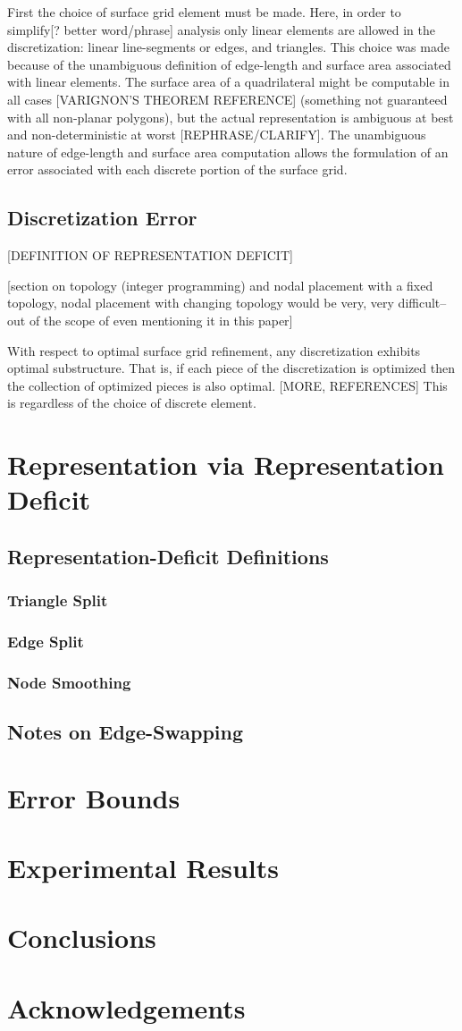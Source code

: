 \documentclass[11pt]{article}
\begin{document}
First the choice of surface grid element must be made. Here, in order to simplify[? better word/phrase] analysis only linear elements are allowed in the discretization: linear line-segments or edges, and triangles. This choice was made because of the unambiguous definition of edge-length and surface area associated with linear elements. The surface area of a quadrilateral might be computable in all cases [VARIGNON'S THEOREM REFERENCE] (something not guaranteed with all non-planar polygons), but the actual representation is ambiguous at best and non-deterministic at worst [REPHRASE/CLARIFY]. The unambiguous nature of edge-length and surface area computation allows the formulation of an error associated with each discrete portion of the surface grid.

\subsection{Discretization Error}
[DEFINITION OF REPRESENTATION DEFICIT]

[section on topology (integer programming) and nodal placement with a fixed topology, nodal placement with changing topology would be very, very difficult--out of the scope of even mentioning it in this paper]

With respect to optimal surface grid refinement, any discretization exhibits optimal substructure. That is, if each piece of the discretization is optimized then the collection of optimized pieces is also optimal. [MORE, REFERENCES] This is regardless of the choice of discrete element.


\section{Representation via Representation Deficit}
\subsection{Representation-Deficit Definitions}
\subsubsection{Triangle Split}
\subsubsection{Edge Split}
\subsubsection{Node Smoothing}
\subsection{Notes on Edge-Swapping}
\section{Error Bounds}
\section{Experimental Results}
\section{Conclusions}
\section{Acknowledgements}
\end{document}

